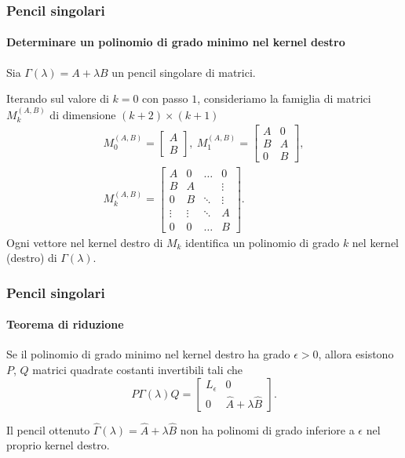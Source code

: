\begin{frame}
	\frametitle{Pencil singolari}
	\framesubtitle{Determinare un polinomio di grado minimo nel kernel destro}
	Sia \(\Gamma(\lambda)=A+\lambda B\) un pencil singolare di matrici.

	Iterando sul valore di $k = 0$ con passo $1$, consideriamo la famiglia di matrici
	$M_k^{(A, B)}$ di dimensione $(k+2) \times (k+1)$
	\begin{gather*}
		M_{0}^{(A, B)} =
			\begin{bmatrix}
				A \\
				B
			\end{bmatrix}, \
		M_{1}^{(A, B)} =
			\begin{bmatrix}
				A & 0 \\
				B & A \\
				0 & B
			\end{bmatrix}, \\
		M_{k}^{(A, B)} =
			\begin{bmatrix}
				A & 0 & \hdots &    0   \\
				B & A &        & \vdots \\
				0 & B & \ddots & \vdots \\
				\vdots & \vdots & \ddots & A \\
				0      &    0   & \hdots & B
			\end{bmatrix}.
	\end{gather*}
	\onslide<2-> Ogni vettore nel kernel destro di $M_k$ identifica un polinomio di grado $k$ nel
	kernel (destro) di
	$\Gamma(\lambda)$.
\end{frame}


\begin{frame}
	\frametitle{Pencil singolari}
	\framesubtitle{Teorema di riduzione}
	\begin{theorem}
		Se il polinomio di grado minimo nel kernel destro ha grado $\epsilon > 0$, allora esistono
		$P$, $Q$ matrici quadrate costanti invertibili tali che
		\[
			P\Gamma(\lambda)Q=\begin{bmatrix}
				L_{\epsilon} & 0 \\
				0 & \widehat{A} + \lambda \widehat{B}
			\end{bmatrix}.
		\]
	\end{theorem}
	 Il pencil ottenuto $\widehat{\Gamma}(\lambda) = \widehat{A} + \lambda \widehat{B}$
	non ha polinomi di grado inferiore a $\epsilon$ nel proprio kernel destro.
\end{frame}